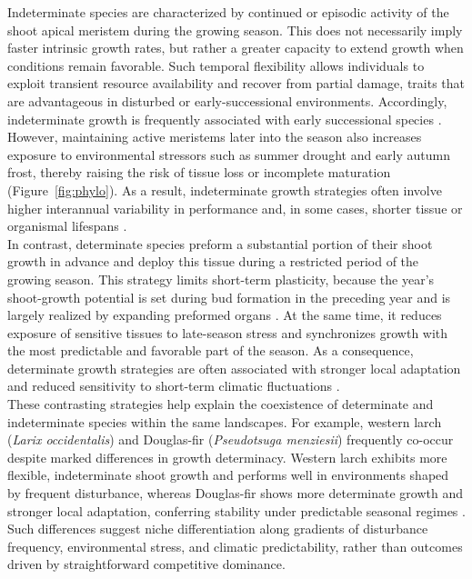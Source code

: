 \documentclass{article}
\begin{document}
Indeterminate species are characterized by continued or episodic activity of the shoot apical meristem during the growing season. This does not necessarily imply faster intrinsic growth rates, but rather a greater capacity to extend growth 
 when conditions remain favorable. Such temporal flexibility allows individuals to exploit transient resource availability and recover from partial damage, traits that are advantageous in disturbed or early-successional environments. Accordingly, indeterminate growth is frequently associated with early successional species \citep{marksRelationExtensionGrowth1975}. However, maintaining active meristems later into the season also increases exposure to environmental stressors such as summer drought and early autumn frost, thereby raising the risk of tissue loss or incomplete maturation (Figure~\ref{fig:phylo}). As a result, indeterminate growth strategies often involve higher interannual variability in performance and, in some cases, shorter tissue or organismal lifespans \citep{milletRelationshipArchitectureSuccessional1999, brienenForestCarbonSink2020b}.\\

In contrast, determinate species preform a substantial portion of their shoot growth in advance and deploy this tissue during a restricted period of the growing season. This strategy limits short-term plasticity, because the year's shoot-growth potential is set during bud formation in the preceding year and is largely realized by expanding preformed organs \citep{gordonPreformationVegetativeBuds2006}. At the same time, it reduces exposure of sensitive tissues to late-season stress and synchronizes growth with the most predictable and favorable part of the season. As a consequence, determinate growth strategies are often associated with stronger local adaptation and reduced sensitivity to short-term climatic fluctuations \citep{leitesForestTreeSpecies2023}.\\

These contrasting strategies help explain the coexistence of determinate and indeterminate species within the same landscapes. For example, western larch (\textit{Larix occidentalis}) and Douglas-fir (\textit{Pseudotsuga menziesii}) frequently co-occur despite marked differences in growth determinacy. Western larch exhibits more flexible, indeterminate shoot growth and performs well in environments shaped by frequent disturbance, whereas Douglas-fir shows more determinate growth and stronger local adaptation, conferring stability under predictable seasonal regimes \citep{roskillyWeakLocalAdaptation2024}. Such differences suggest niche differentiation along gradients of disturbance frequency, environmental stress, and climatic predictability, rather than outcomes driven by straightforward competitive dominance.\\
\end{document}
